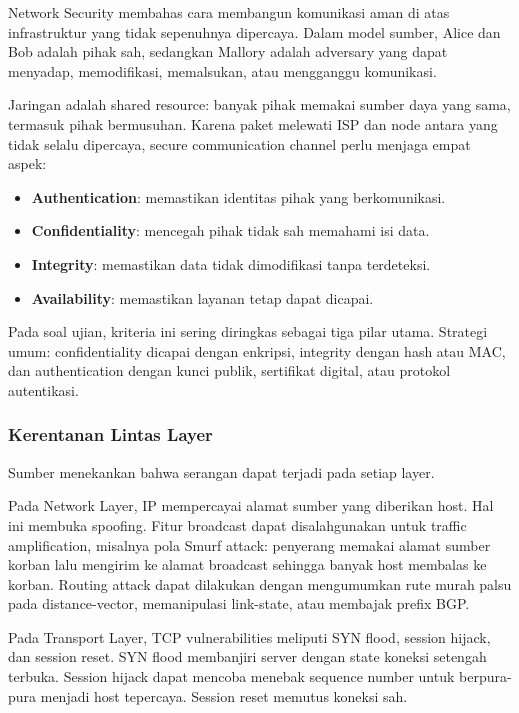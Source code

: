 \begin{jawab}
Network Security membahas cara membangun komunikasi aman di atas infrastruktur yang tidak sepenuhnya dipercaya. Dalam model sumber, Alice dan Bob adalah pihak sah, sedangkan Mallory adalah adversary yang dapat menyadap, memodifikasi, memalsukan, atau mengganggu komunikasi.
\end{jawab}

Jaringan adalah shared resource: banyak pihak memakai sumber daya yang sama, termasuk pihak bermusuhan. Karena paket melewati ISP dan node antara yang tidak selalu dipercaya, secure communication channel perlu menjaga empat aspek:

\begin{itemize}
    \item \textbf{Authentication}: memastikan identitas pihak yang berkomunikasi.
    \item \textbf{Confidentiality}: mencegah pihak tidak sah memahami isi data.
    \item \textbf{Integrity}: memastikan data tidak dimodifikasi tanpa terdeteksi.
    \item \textbf{Availability}: memastikan layanan tetap dapat dicapai.
\end{itemize}

Pada soal ujian, kriteria ini sering diringkas sebagai tiga pilar utama. Strategi umum: confidentiality dicapai dengan enkripsi, integrity dengan hash atau MAC, dan authentication dengan kunci publik, sertifikat digital, atau protokol autentikasi.

\subsubsection*{Kerentanan Lintas Layer}

Sumber menekankan bahwa serangan dapat terjadi pada setiap layer.

Pada Network Layer, IP mempercayai alamat sumber yang diberikan host. Hal ini membuka spoofing. Fitur broadcast dapat disalahgunakan untuk traffic amplification, misalnya pola Smurf attack: penyerang memakai alamat sumber korban lalu mengirim ke alamat broadcast sehingga banyak host membalas ke korban. Routing attack dapat dilakukan dengan mengumumkan rute murah palsu pada distance-vector, memanipulasi link-state, atau membajak prefix BGP.

Pada Transport Layer, TCP vulnerabilities meliputi SYN flood, session hijack, dan session reset. SYN flood membanjiri server dengan state koneksi setengah terbuka. Session hijack dapat mencoba menebak sequence number untuk berpura-pura menjadi host tepercaya. Session reset memutus koneksi sah.

